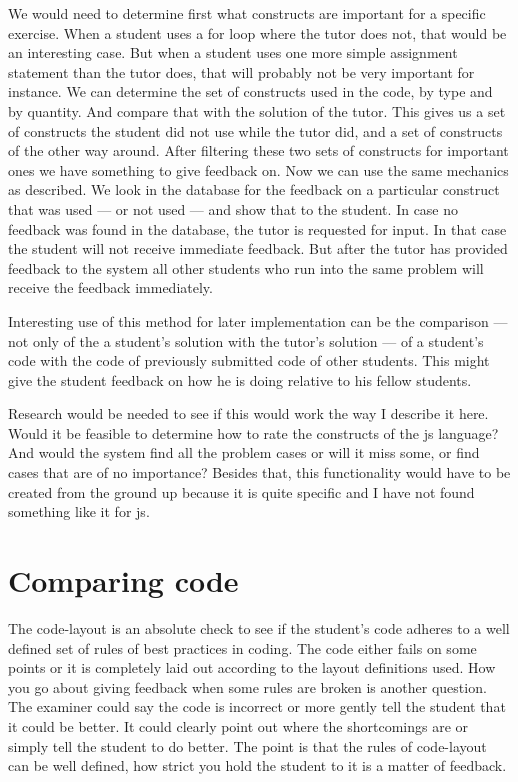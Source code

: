 We would need to determine first what \glspl{construct} are important
for a specific \gls{exercise}.
When a \gls{student} uses a for loop where the \gls{tutor} does not,
that would be an interesting case.
But when a \gls{student} uses one more simple assignment statement
than the \gls{tutor} does,
that will probably not be very important for instance.
We can determine the set of \glspl{construct} used in the \gls{code},
by type and by quantity.
And compare that with the \gls{solution} of the \gls{tutor}.
This gives us a set of \glspl{construct} the \gls{student} did not use
while the \gls{tutor} did,
and a set of \glspl{construct} of the other way around.
After filtering these two sets of \glspl{construct} for important ones
we have something to give \gls{feedback} on.
Now we can use the same mechanics as \citet{watson2011learning} described.
We look in the database for the \gls{feedback}
on a particular \gls{construct} that was used --- or not used ---
and show that to the \gls{student}.
In case no \gls{feedback} was found in the database,
the \gls{tutor} is requested for input.
In that case the \gls{student} will not receive immediate \gls{feedback}.
But after the \gls{tutor} has provided \gls{feedback} to the system
all other \glspl{student} who run into the same problem
will receive the \gls{feedback} immediately.

Interesting use of this method for later implementation can be the comparison
--- not only of the a \gls{student}'s \gls{solution}
with the \gls{tutor}'s \gls{solution} ---
of a \gls{student}'s \gls{code} with the \gls{code}
of previously submitted \gls{code} of other \glspl{student}.
This might give the \gls{student} \gls{feedback} on how he is doing
relative to his fellow \glspl{student}.

Research would be needed to see if this would work
the way I describe it here.
Would it be feasible to determine how to rate the \glspl{construct}
of the \gls{js} language?
And would the system find all the problem cases or will it miss some,
or find cases that are of no importance?
Besides that, this functionality would have to be created from the ground up
because it is quite specific and I have not found something like it
for \gls{js}.

\section{Comparing code}

The \gls{code-layout} is an absolute check to see
if the \gls{student}'s \gls{code} adheres to a well defined set
of rules of best practices in coding.
The \gls{code} either fails on some points
or it is completely laid out according to the layout definitions used.
How you go about giving \gls{feedback} when some rules are broken
is another question.
The \gls{examiner} could say the \gls{code} is incorrect
or more gently tell the \gls{student} that it could be better.
It could clearly point out where the shortcomings are
or simply tell the \gls{student} to do better.
The point is that the rules of \gls{code-layout} can be well defined,
how strict you hold the \gls{student} to it is a matter of \gls{feedback}.

